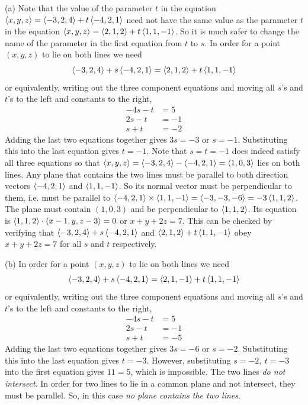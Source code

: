 \begin{solution}
(a) Note that the value of the parameter $t$ in the 
equation $\left< x,y,z\right> = \left< -3,2,4\right>+t\left< -4,2,1\right>$ 
need not have the same value as the parameter $t$ in the 
equation $\left< x,y,z\right> = \left< 2,1,2\right>+t\left< 1,1,-1\right>$. So it is 
much safer to change the name of the parameter in the first equation 
from $t$ to $s$. In order for a point $(x,y,z)$ to lie on both 
lines we need
\begin{equation*}
\left< -3,2,4\right>+s\left< -4,2,1\right> = \left< 2,1,2\right>+t\left< 1,1,-1\right>
\end{equation*}
or equivalently, writing out the three component equations and moving
all $s$'s and $t$'s to the left and constants to the right,
\begin{align*}
-4s -t &= 5\\
2s -t &= -1\\
s +t &= -2
\end{align*}
Adding the last two equations together gives $3s=-3$ or $s=-1$. Substituting
this into the last equation gives $t=-1$. Note that $s=t=-1$ does indeed
satisfy all three equations so that 
 $\left< x,y,z\right>=\left< -3,2,4\right>-\left< -4,2,1\right>=\left< 1,0,3\right>$
lies on both lines. Any plane that contains the two lines must be parallel
to both direction vectors $\left< -4,2,1\right>$ and $\left< 1,1,-1\right>$. So 
its normal vector must be perpendicular to them, i.e. must be parallel to 
$\left< -4,2,1\right>\times\left< 1,1,-1\right>=\left< -3,-3,-6\right>=-3\left< 1,1,2\right>$. 
The plane must contain $(1,0,3)$ and be perpendicular to $\left< 1,1,2\right>$. 
Its equation is $\left< 1,1,2\right>\cdot\left< x-1,y,z-3\right>=0$ or $x+y+2z=7$. 
This can be checked by verifying that $\left< -3,2,4\right>+s\left< -4,2,1\right>$ and 
$\left< 2,1,2\right>+t\left< 1,1,-1\right>$ obey
$x+y+2z=7$ for all $s$ and $t$ respectively. 

(b) In order for a point $(x,y,z)$ to lie on both lines we need
\begin{equation*}
\left< -3,2,4\right>+s\left< -4,2,1\right> = \left< 2,1,-1\right>+t\left< 1,1,-1\right>
\end{equation*}
or equivalently, writing out the three component equations and moving
all $s$'s and $t$'s to the left and constants to the right,
\begin{align*}
-4s -t &= 5\\
2s -t &= -1\\
s +t &= -5
\end{align*}
Adding the last two equations together gives $3s=-6$ or $s=-2$. Substituting
this into the last equation gives $t=-3$. However, substituting 
$s=-2,\ t=-3$ into the first equation gives $11=5$, which is impossible. The
two lines \emph{do not intersect}. In order for two lines to lie
in a common plane and not intersect, they must be parallel. So, in this
case \emph{no plane contains the two lines}.


\end{solution}
